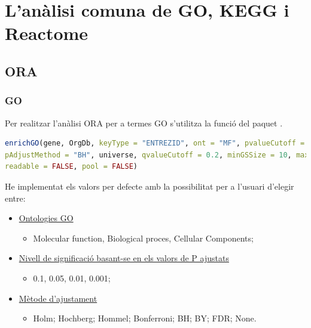 \documentclass[]{article}
\begin{document}
\section{L'anàlisi comuna de GO, KEGG i Reactome}
\label{sec:ACom}

\subsection{ORA}

\subsubsection{GO}

Per realitzar l'anàlisi ORA per a termes GO s'utilitza la funció  del paquet .
\begin{lstlisting}[language=R]
enrichGO(gene, OrgDb, keyType = "ENTREZID", ont = "MF", pvalueCutoff = 0.05, 
pAdjustMethod = "BH", universe, qvalueCutoff = 0.2, minGSSize = 10, maxGSSize = 500, 
readable = FALSE, pool = FALSE)
\end{lstlisting}

He implementat els valors per defecte amb la possibilitat per a l’usuari d'elegir entre:

\begin{itemize}
\item \underline{Ontologies GO} 
\begin{itemize}
\item Molecular function, Biological proces, Cellular Components;
\end{itemize}
\item \underline{Nivell de significació basant-se en els valors de P ajustats}
\begin{itemize}
\item 0.1, 0.05, 0.01, 0.001;
\end{itemize}
\item \underline{Mètode d'ajustament}
\begin{itemize}
\item Holm; Hochberg; Hommel; Bonferroni; BH; BY; FDR; None.
\end{itemize}
\end{itemize}
\end{document}
